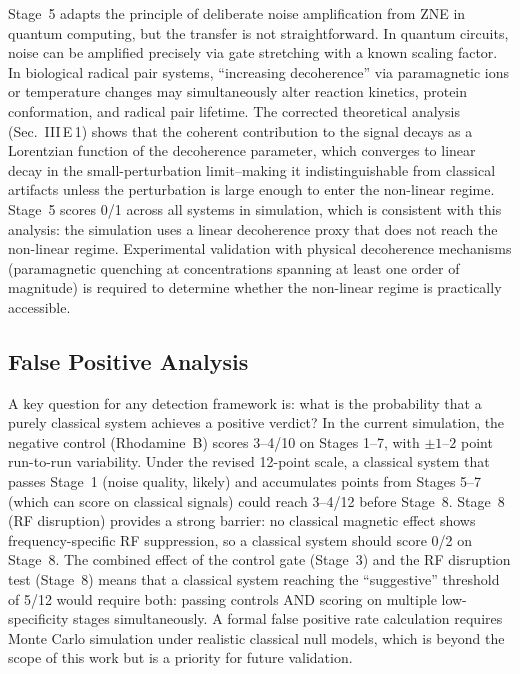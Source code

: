 \documentclass[preprint,amsmath,amssymb]{revtex4-2}
\begin{document}
Stage~5 adapts the principle of deliberate noise amplification from ZNE in quantum computing, but the transfer is not straightforward. In quantum circuits, noise can be amplified precisely via gate stretching with a known scaling factor. In biological radical pair systems, ``increasing decoherence'' via paramagnetic ions or temperature changes may simultaneously alter reaction kinetics, protein conformation, and radical pair lifetime. The corrected theoretical analysis (Sec.~III\,E\,1) shows that the coherent contribution to the signal decays as a Lorentzian function of the decoherence parameter, which converges to linear decay in the small-perturbation limit--making it indistinguishable from classical artifacts unless the perturbation is large enough to enter the non-linear regime. Stage~5 scores 0/1 across all systems in simulation, which is consistent with this analysis: the simulation uses a linear decoherence proxy that does not reach the non-linear regime. Experimental validation with physical decoherence mechanisms (paramagnetic quenching at concentrations spanning at least one order of magnitude) is required to determine whether the non-linear regime is practically accessible.

\subsection{False Positive Analysis}

A key question for any detection framework is: what is the probability that a purely classical system achieves a positive verdict? In the current simulation, the negative control (Rhodamine~B) scores 3--4/10 on Stages 1--7, with $\pm 1$--$2$ point run-to-run variability. Under the revised 12-point scale, a classical system that passes Stage~1 (noise quality, likely) and accumulates points from Stages 5--7 (which can score on classical signals) could reach 3--4/12 before Stage~8. Stage~8 (RF disruption) provides a strong barrier: no classical magnetic effect shows frequency-specific RF suppression, so a classical system should score 0/2 on Stage~8. The combined effect of the control gate (Stage~3) and the RF disruption test (Stage~8) means that a classical system reaching the ``suggestive'' threshold of 5/12 would require both: passing controls AND scoring on multiple low-specificity stages simultaneously. A formal false positive rate calculation requires Monte Carlo simulation under realistic classical null models, which is beyond the scope of this work but is a priority for future validation.
\end{document}
